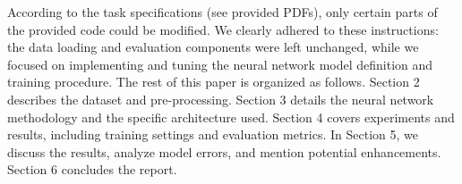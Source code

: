 According to the task specifications (see provided PDFs), only certain parts of the provided code could be modified. We clearly adhered to these instructions: the data loading and evaluation components were left unchanged, while we focused on implementing and tuning the neural network model definition and training procedure. The rest of this paper is organized as follows. Section 2 describes the dataset and pre-processing. Section 3 details the neural network methodology and the specific architecture used. Section 4 covers experiments and results, including training settings and evaluation metrics. In Section 5, we discuss the results, analyze model errors, and mention potential enhancements. Section 6 concludes the report. 